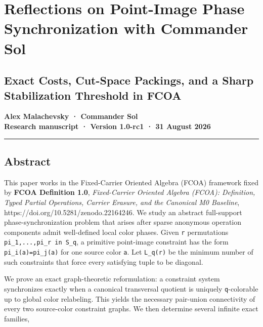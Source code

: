 \hypertarget{reflections-on-point-image-phase-synchronization-with-commander-sol}{%
\section{Reflections on Point-Image Phase Synchronization with Commander
Sol}\label{reflections-on-point-image-phase-synchronization-with-commander-sol}}

\hypertarget{exact-costs-cut-space-packings-and-a-sharp-stabilization-threshold-in-fcoa}{%
\subsection{Exact Costs, Cut-Space Packings, and a Sharp Stabilization
Threshold in
FCOA}\label{exact-costs-cut-space-packings-and-a-sharp-stabilization-threshold-in-fcoa}}

\textbf{Alex Malachevsky · Commander Sol}\\
\textbf{Research manuscript · Version 1.0-rc1 · 31 August 2026}

\begin{center}\rule{0.5\linewidth}{0.5pt}\end{center}

\hypertarget{abstract}{%
\subsection{Abstract}\label{abstract}}

This paper works in the Fixed-Carrier Oriented Algebra (FCOA) framework
fixed by \textbf{FCOA Definition 1.0}, \emph{Fixed-Carrier Oriented
Algebra (FCOA): Definition, Typed Partial Operations, Carrier Erasure,
and the Canonical M0 Baseline}, https://doi.org/10.5281/zenodo.22164246.
We study an abstract full-support phase-synchronization problem that
arises after sparse anonymous operation components admit well-defined
local color phases. Given \texttt{r} permutations
\texttt{pi\_1,...,pi\_r\ in\ S\_q}, a primitive point-image constraint
has the form \texttt{pi\_i(a)=pi\_j(a)} for one source color \texttt{a}.
Let \texttt{L\_q(r)} be the minimum number of such constraints that
force every satisfying tuple to be diagonal.

We prove an exact graph-theoretic reformulation: a constraint system
synchronizes exactly when a canonical transversal quotient is uniquely
\texttt{q}-colorable up to global color relabeling. This yields the
necessary pair-union connectivity of every two source-color constraint
graphs. We then determine several infinite exact families,

